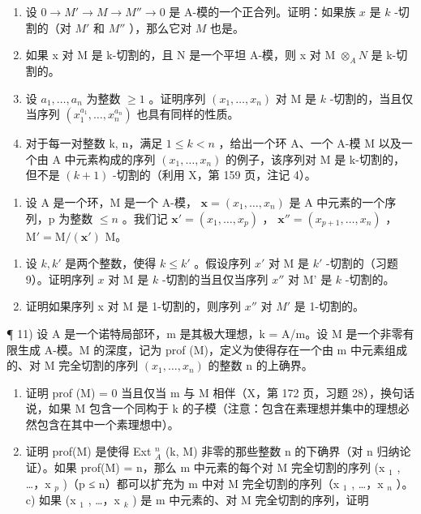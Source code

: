 \begin{enumerate}
\def\labelenumi{\alph{enumi})}
\item
  设 \(0 \to M' \to M \to M'' \to 0\) 是 A-模的一个正合列。证明：如果族 \(x\) 是 \(k\) -切割的（对 \(M'\) 和 \(M''\) ），那么它对 \(M\) 也是。
\item
  如果 x 对 M 是 k-切割的，且 N 是一个平坦 A-模，则 x 对 M \(\otimes_{A} N\) 是 k-切割的。
\item
  设 \(a_{1},\ldots,a_{n}\) 为整数 \(\geqslant 1\) 。证明序列 \((x_{1},\ldots,x_{n})\) 对 M 是 \(k\) -切割的，当且仅当序列 \((x_{1}^{a_{1}},\ldots,x_{n}^{a_{n}})\) 也具有同样的性质。
\item
  对于每一对整数 k, n，满足 \(1 \leqslant k < n\) ，给出一个环 A、一个 A-模 M 以及一个由 A 中元素构成的序列 \((x_{1}, \ldots, x_{n})\) 的例子，该序列对 M 是 k-切割的，但不是 \((k + 1)\) -切割的（利用 X，第 159 页，注记 4）。
\end{enumerate}

\begin{enumerate}
\def\labelenumi{\arabic{enumi})}
\setcounter{enumi}{9}
\tightlist
\item
  设 A 是一个环，M 是一个 A-模， \(\boldsymbol{x} = (x_{1}, \ldots, x_{n})\) 是 A 中元素的一个序列，p 为整数 \(\leqslant n\) 。我们记 \(\boldsymbol{x}' = (x_{1}, \ldots, x_{p})\) ， \(\boldsymbol{x}'' = (x_{p+1}, \ldots, x_{n})\) ， \(\mathrm{M}' = \mathrm{M}/(\boldsymbol{x}')\) M。
\end{enumerate}

\begin{enumerate}
\def\labelenumi{\alph{enumi})}
\item
  设 \(k, k'\) 是两个整数，使得 \(k \leqslant k'\) 。假设序列 \(x'\) 对 M 是 \(k'\) -切割的（习题 9）。证明序列 \(x\) 对 M 是 \(k\) -切割的当且仅当序列 \(x''\) 对 M' 是 \(k\) -切割的。
\item
  证明如果序列 x 对 M 是 1-切割的，则序列 \(x''\) 对 \(M'\) 是 1-切割的。
\end{enumerate}

¶ 11) 设 A 是一个诺特局部环，m 是其极大理想，k = A/m。设 M 是一个非零有限生成 A-模。M 的深度，记为 prof (M)，定义为使得存在一个由 m 中元素组成的、对 M 完全切割的序列 \((x_{1}, \ldots, x_{n})\) 的整数 n 的上确界。

\begin{enumerate}
\def\labelenumi{\alph{enumi})}
\item
  证明 prof (M) = 0 当且仅当 m 与 M 相伴（X，第 172 页，习题 28），换句话说，如果 M 包含一个同构于 k 的子模（注意：包含在素理想并集中的理想必然包含在其中一个素理想中）。
\item
  证明 prof(M) 是使得 Ext \(_{A}^{n}\) (k, M) 非零的那些整数 n 的下确界（对 n 归纳论证）。如果 prof(M) = n，那么 m 中元素的每个对 M 完全切割的序列 (x \(_{1}\) , \ldots，x \(_{p}\) )（p ≤ n）都可以扩充为 m 中对 M 完全切割的序列（x \(_{1}\) , \ldots，x \(_{n}\) ）。 c) 如果 (x \(_{1}\) , \ldots，x \(_{k}\) ) 是 m 中元素的、对 M 完全切割的序列，证明
\end{enumerate}

